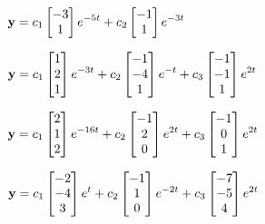 $\mathbf{y}=\displaystyle{c_1\begin{bmatrix}-3\\1\end{bmatrix}e^{-5t}
+c_2\begin{bmatrix}-1\\1\end{bmatrix}e^{-3t}}$

\smallskip

$\mathbf{y}=\displaystyle{c_1\begin{bmatrix}1\\2\\1\end{bmatrix}e^{-3t}
+c_2\begin{bmatrix}-1\\-4\\1\end{bmatrix}e^{-t}
+c_3\begin{bmatrix}-1\\-1\\1\end{bmatrix}e^{2t}}$

\smallskip

$\mathbf{y}=\displaystyle{c_1\begin{bmatrix}2\\1\\2\end{bmatrix}e^{-16t}
+c_2\begin{bmatrix}-1\\2\\0\end{bmatrix}e^{2t}
+c_3\begin{bmatrix}-1\\0\\1\end{bmatrix}e^{2t}}$

\smallskip
{}
$\mathbf{y}=\displaystyle{c_1\begin{bmatrix}-2\\-4\\3\end{bmatrix}e^t
+c_2\begin{bmatrix}-1\\1\\0\end{bmatrix}e^{-2t}
+c_3\begin{bmatrix}-7\\-5\\4\end{bmatrix}e^{2t}}$

